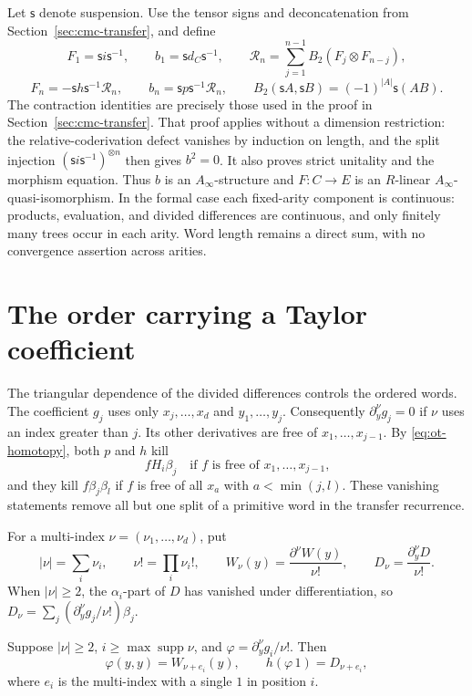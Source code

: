 Let \(\mathsf s\) denote suspension. Use the tensor signs and
deconcatenation from Section~\ref{sec:cmc-transfer}, and define
\[
 F_1=\mathsf s i\mathsf s^{-1},\qquad b_1=\mathsf s d_C\mathsf s^{-1},
 \qquad
 \mathcal R_n=\sum_{j=1}^{n-1}B_2(F_j\otimes F_{n-j}),
\]
\[
 F_n=-\mathsf s h\mathsf s^{-1}\mathcal R_n,\qquad
 b_n=\mathsf s p\mathsf s^{-1}\mathcal R_n,\qquad
 B_2(\mathsf s A,\mathsf s B)=(-1)^{|A|}\mathsf s(AB).
\]
The contraction identities are precisely those used in the
proof in Section~\ref{sec:cmc-transfer}. That proof applies
without a dimension restriction: the relative-coderivation defect
vanishes by induction on length, and the split injection
\((\mathsf s i\mathsf s^{-1})^{\otimes n}\) then gives \(b^2=0\).
It also proves strict unitality and the morphism equation.
Thus \(b\) is an \(A_\infty\)-structure and \(F:C\to E\)
is an \(R\)-linear \(A_\infty\)-quasi-isomorphism.
In the formal case each fixed-arity component is continuous:
products, evaluation, and divided differences are continuous,
and only finitely many trees occur in each arity.
Word length remains a direct sum, with no convergence assertion
across arities.

\section{The order carrying a Taylor coefficient}
\label{sec:ot-coefficients}

The triangular dependence of the divided differences controls
the ordered words. The coefficient \(g_j\) uses only
\(x_j,\ldots,x_d\) and \(y_1,\ldots,y_j\).
Consequently
\(\partial_y^\nu g_j=0\) if \(\nu\) uses an index greater
than \(j\). Its other derivatives are free of
\(x_1,\ldots,x_{j-1}\).
By \eqref{eq:ot-homotopy}, both \(p\) and \(h\) kill
\[
 fH_i\beta_j
 \quad\text{if \(f\) is free of \(x_1,\ldots,x_{j-1}\),}
\]
and they kill \(f\beta_j\beta_l\) if \(f\) is free of
all \(x_a\) with \(a<\min(j,l)\).
These vanishing statements remove all but one split of a
primitive word in the transfer recurrence.

For a multi-index \(\nu=(\nu_1,\ldots,\nu_d)\), put
\[
 |\nu|=\sum_i\nu_i,\qquad \nu!=\prod_i\nu_i!,\qquad
 W_\nu(y)=\frac{\partial^\nu W(y)}{\nu!},\qquad
 D_\nu=\frac{\partial_y^\nu D}{\nu!}.
\]
When \(|\nu|\ge2\), the \(\alpha_i\)-part of \(D\) has
vanished under differentiation, so
\(D_\nu=\sum_j(\partial_y^\nu g_j/\nu!)\beta_j\).

\begin{lemma}\label{lem:ot-remainder}
Suppose \(|\nu|\ge2\), \(i\ge\max\operatorname{supp}\nu\),
and \(\varphi=\partial_y^\nu g_i/\nu!\).
Then
\[
 \varphi(y,y)=W_{\nu+e_i}(y),\qquad
 h(\varphi\,1)=D_{\nu+e_i},
\]
where \(e_i\) is the multi-index with a single \(1\) in position \(i\).
\end{lemma}

